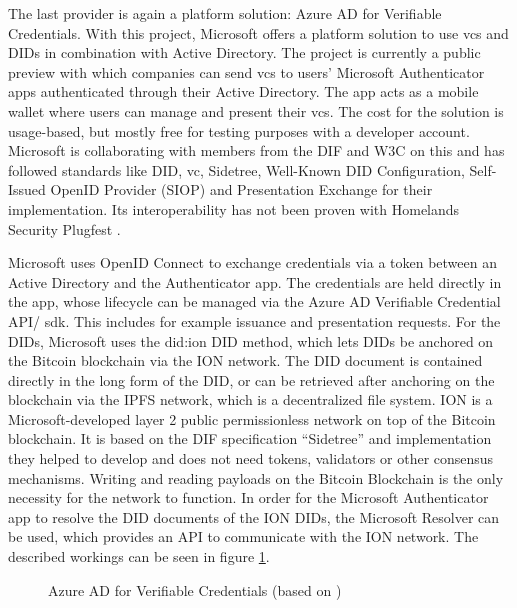     The last provider is again a platform solution: Azure AD for Verifiable Credentials. With this project, Microsoft offers a platform solution to use \acp{vc} and \acp{DID} in combination with Active Directory. The project is currently a public preview with which companies can send \acp{vc} to users' Microsoft Authenticator apps authenticated through their Active Directory. The app acts as a mobile wallet where users can manage and present their \acp{vc}. The cost for the solution is usage-based, but mostly free for testing purposes with a developer account. Microsoft is collaborating with members from the \ac{DIF} and W3C on this and has followed standards like \ac{DID}, \ac{vc}, Sidetree, Well-Known \ac{DID} Configuration, Self-Issued OpenID Provider (SIOP) and Presentation Exchange for their implementation. Its interoperability has not been proven with Homelands Security Plugfest \cite{homeland_security_interoperability_2021}. \cite{neira_introduction_2021, simons_announcing_2021, microsoft_identitatsnachweis-losungen_2021}
    
    Microsoft uses OpenID Connect to exchange credentials via a token between an Active Directory and the Authenticator app. The credentials are held directly in the app, whose lifecycle can be managed via the Azure AD Verifiable Credential API/ \ac{sdk}. This includes for example issuance and presentation requests. For the \acp{DID}, Microsoft uses the did:ion \ac{DID} method, which lets \acp{DID} be anchored on the Bitcoin blockchain via the ION network. The \ac{DID} document is contained directly in the long form of the \ac{DID}, or can be retrieved after anchoring on the blockchain via the IPFS network, which is a decentralized file system. ION is a Microsoft-developed layer 2 public permissionless network on top of the Bitcoin blockchain. It is based on the \ac{DIF} specification “Sidetree” and implementation they helped to develop and does not need tokens, validators or other consensus mechanisms. Writing and reading payloads on the Bitcoin Blockchain is the only necessity for the network to function. In order for the Microsoft Authenticator app to resolve the \ac{DID} documents of the ION \acp{DID}, the Microsoft Resolver can be used, which provides an API to communicate with the ION network. The described workings can be seen in figure \ref{figure: azure ad}. \cite{neira_introduction_2021}
    
    \begin{figure}[ht]
	    \centering    	   
	    \makebox[\textwidth]{}
        \caption[Azure AD for Verifiable Credentials]{Azure AD for Verifiable Credentials (based on \cite{neira_introduction_2021})}
        \label{figure: azure ad}
    \end{figure}
    

